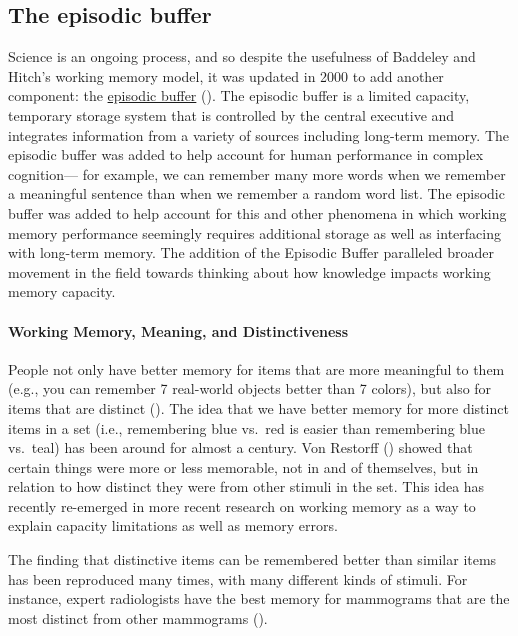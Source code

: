 \documentclass[
]{krantz}
\begin{document}
\subsection*{The episodic buffer}\label{the-episodic-buffer}


Science is an ongoing process, and so despite the usefulness of Baddeley and Hitch's working memory model, it was updated in 2000 to add another component: the \hyperref[episodic-buffer]{episodic buffer} (). The episodic buffer is a limited capacity, temporary storage system that is controlled by the central executive and integrates information from a variety of sources including long-term memory. The episodic buffer was added to help account for human performance in complex cognition--- for example, we can remember many more words when we remember a meaningful sentence than when we remember a random word list. The episodic buffer was added to help account for this and other phenomena in which working memory performance seemingly requires additional storage as well as interfacing with long-term memory. The addition of the Episodic Buffer paralleled broader movement in the field towards thinking about how knowledge impacts working memory capacity.

\paragraph*{Working Memory, Meaning, and Distinctiveness}\label{working-memory-meaning-and-distinctiveness}

People not only have better memory for items that are more meaningful to them (e.g., you can remember 7 real-world objects better than 7 colors), but also for items that are distinct (). The idea that we have better memory for more distinct items in a set (i.e., remembering blue vs.~red is easier than remembering blue vs.~teal) has been around for almost a century. Von Restorff () showed that certain things were more or less memorable, not in and of themselves, but in relation to how distinct they were from other stimuli in the set. This idea has recently re-emerged in more recent research on working memory as a way to explain capacity limitations as well as memory errors.

The finding that distinctive items can be remembered better than similar items has been reproduced many times, with many different kinds of stimuli. For instance, expert radiologists have the best memory for mammograms that are the most distinct from other mammograms ().
\end{document}
